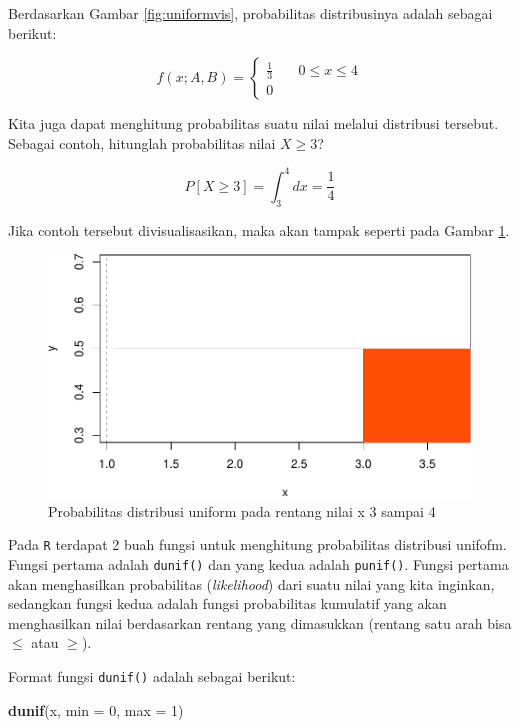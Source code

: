 \documentclass[]{book}
\newenvironment{Shaded}{\begin{snugshade}}{\end{snugshade}}
\newcommand{\KeywordTok}[1]{\textcolor[rgb]{0.13,0.29,0.53}{\textbf{#1}}}
\newcommand{\DataTypeTok}[1]{\textcolor[rgb]{0.13,0.29,0.53}{#1}}
\newcommand{\DecValTok}[1]{\textcolor[rgb]{0.00,0.00,0.81}{#1}}
\newcommand{\NormalTok}[1]{#1}
\begin{document}
Berdasarkan Gambar \ref{fig:uniformvis}, probabilitas distribusinya
adalah sebagai berikut:

\[
f(x;A,B) =
  \begin{cases}
    \frac{1}{3}       & \quad 0\le x\le 4\\
    0                   & \quad\text{}
    \end{cases}
\]

Kita juga dapat menghitung probabilitas suatu nilai melalui distribusi
tersebut. Sebagai contoh, hitunglah probabilitas nilai \(X\ge3\)?

\[
P\left[X\ge3\right]=\int_3^4dx=\frac{1}{4}
\]

Jika contoh tersebut divisualisasikan, maka akan tampak seperti pada
Gambar \ref{fig:uniformvis2}.

\begin{figure}

{\centering \includegraphics[width=0.7\linewidth]{EnvStat_files/figure-latex/uniformvis2-1} 

}

\caption{Probabilitas distribusi uniform pada rentang nilai x 3 sampai 4}\label{fig:uniformvis2}
\end{figure}

Pada \texttt{R} terdapat 2 buah fungsi untuk menghitung probabilitas
distribusi unifofm. Fungsi pertama adalah \texttt{dunif()} dan yang
kedua adalah \texttt{punif()}. Fungsi pertama akan menghasilkan
probabilitas (\emph{likelihood}) dari suatu nilai yang kita inginkan,
sedangkan fungsi kedua adalah fungsi probabilitas kumulatif yang akan
menghasilkan nilai berdasarkan rentang yang dimasukkan (rentang satu
arah bisa \(\le\) atau \(\ge\)).

Format fungsi \texttt{dunif()} adalah sebagai berikut:

\begin{Shaded}
\begin{Highlighting}[]
\KeywordTok{dunif}\NormalTok{(x, }\DataTypeTok{min =} \DecValTok{0}\NormalTok{, }\DataTypeTok{max =} \DecValTok{1}\NormalTok{)}
\end{Highlighting}
\end{Shaded}
\end{document}
